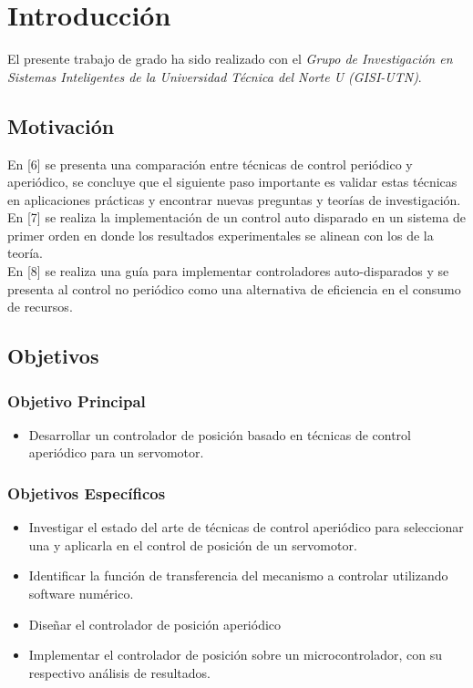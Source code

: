 \chapter{Introducción}%
El presente trabajo de grado ha sido realizado con el {\em Grupo de Investigaci\'on en Sistemas Inteligentes de la Universidad T\'ecnica del Norte U (GISI-UTN)}.
\section{Motivación}
En [6] se presenta una comparación entre técnicas de control periódico y aperiódico, se concluye que el siguiente paso importante es validar estas técnicas en aplicaciones prácticas y encontrar nuevas preguntas y teorías de investigación. \\

En [7] se realiza la implementación de un control auto disparado en un sistema de primer orden en donde los resultados experimentales se alinean con los de la teoría.\\

En [8] se realiza  una guía para implementar  controladores auto-disparados y se presenta al control no periódico como una alternativa de eficiencia en el consumo de recursos.\\

 
\section{Objetivos}

\subsection{Objetivo Principal}
			\begin{itemize}
			\item Desarrollar un controlador de posición basado en técnicas de control aperiódico para un servomotor.
			\end{itemize}
				 
\subsection{Objetivos Espec\'ificos}
			\begin{itemize}
			\item   Investigar el estado del arte de técnicas de control aperiódico para seleccionar una y aplicarla en el control de posición de un servomotor.
			\item	Identificar la función de transferencia del mecanismo a controlar utilizando software numérico.
			\item	Diseñar el controlador de posición aperiódico  
			\item	Implementar el controlador de posición sobre un microcontrolador, con su respectivo análisis de resultados.
			\end{itemize} 
			
